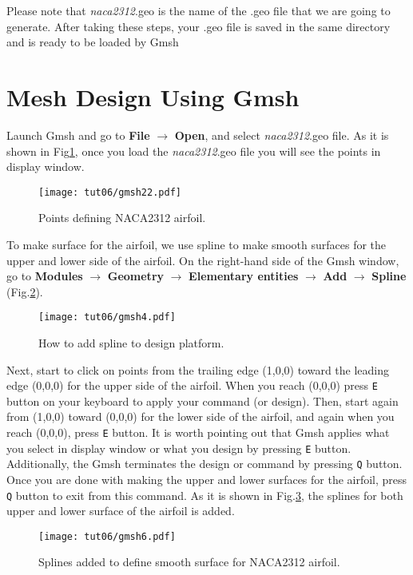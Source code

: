 Please note that \textit{naca2312}.geo is the name of the .geo file that we are going to generate. After taking these steps, your .geo file is saved in the same directory and is ready to be loaded by Gmsh
\section{Mesh Design Using Gmsh}
Launch Gmsh and go to \textbf{File} $\rightarrow$ \textbf{Open}, and select \textit{naca2312}.geo file. As it is shown in Fig\ref{fig6:gmsh22}, once you load the \textit{naca2312}.geo file you will see the points in display window.
\begin{figure}[htbp]
    \centering
    \texttt{[image: tut06/gmsh22.pdf]}
    \caption{Points defining NACA2312 airfoil.}
    \label{fig6:gmsh22}
\end{figure}
To make surface for the airfoil, we use spline to make smooth surfaces for the upper and lower side of the airfoil. On the right-hand side of the Gmsh window, go to \textbf{Modules} $\rightarrow$ \textbf{Geometry} $\rightarrow$ \textbf{Elementary entities} $\rightarrow$ \textbf{Add} $\rightarrow$ \textbf{Spline} (Fig.\ref{fig6:gmsh4}).
\begin{figure}[htbp]
    \centering
    \texttt{[image: tut06/gmsh4.pdf]}
    \caption{How to add spline to design platform.}
    \label{fig6:gmsh4}
\end{figure}
Next, start to click on points from the trailing edge (1,0,0) toward the leading edge (0,0,0) for the upper side of the airfoil. When you reach (0,0,0) press \texttt{E} button on your keyboard to apply your command (or design). Then, start again from (1,0,0) toward (0,0,0) for the lower side of the airfoil, and again when you reach (0,0,0), press \texttt{E} button. It is worth pointing out that Gmsh applies what you select in display window or what you design by pressing \texttt{E} button. Additionally, the Gmsh terminates the design or command by pressing \texttt{Q} button. Once you are done with making the upper and lower surfaces for the airfoil, press \texttt{Q} button to exit from this command. As it is shown in Fig.\ref{fig6:gmsh6}, the splines for both upper and lower surface of the airfoil is added.
\begin{figure}[htbp]
    \centering
    \texttt{[image: tut06/gmsh6.pdf]}
    \caption{Splines added to define smooth surface for NACA2312 airfoil.}
    \label{fig6:gmsh6}
\end{figure}
